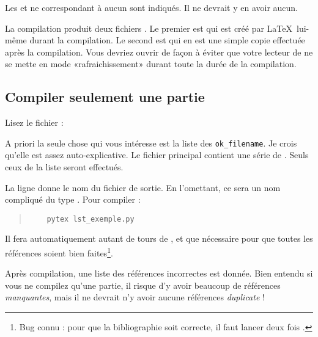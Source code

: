Les  et  ne correspondant à aucun  sont indiqués. Il ne devrait y en avoir aucun.

La compilation produit deux fichiers . Le premier est  qui est créé par \LaTeX\ lui-même durant la compilation. Le second est  qui en est une simple copie effectuée après la compilation. Vous devriez ouvrir  de façon à éviter que votre lecteur de  ne se mette en mode «rafraichissement» durant toute la durée de la compilation.

\subsection{Compiler seulement une partie}

Lisez le fichier  :



A priori la seule chose qui vous intéresse est la liste des \texttt{ok\_filename}. Je crois qu'elle est assez auto-explicative. Le fichier principal  contient une série de . Seuls ceux de la liste seront effectués.

La ligne  donne le nom du fichier de sortie. En l'omettant, ce sera un nom compliqué du type . Pour compiler :
\begin{quote}
    \begin{verbatim}
    pytex lst_exemple.py 
    \end{verbatim}
\end{quote}
Il fera automatiquement autant de tours de ,  et  que nécessaire pour que toutes les références soient bien faites\footnote{Bug connu : pour que la bibliographie soit correcte, il faut lancer deux fois .}.

Après compilation, une liste des références incorrectes est donnée. Bien entendu si vous ne compilez qu'une partie, il risque d'y avoir beaucoup de références \emph{manquantes}, mais il ne devrait n'y avoir aucune références \emph{duplicate} !

